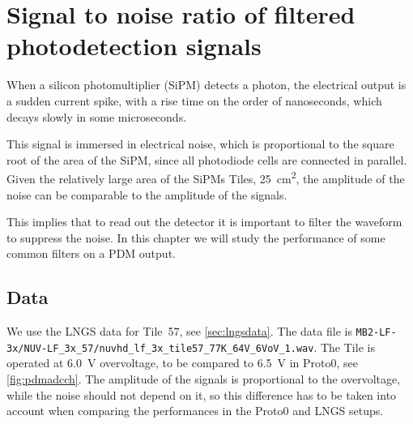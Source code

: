 \chapter{Signal to noise ratio of filtered photodetection signals}
\label{ch:snr}

When a silicon photomultiplier (SiPM) detects a photon, the electrical output
is a sudden current spike, with a rise time on the order of nanoseconds, which
decays slowly in some microseconds.

This signal is immersed in electrical noise, which is proportional to the
square root of the area of the SiPM, since all photodiode cells are connected
in parallel. Given the relatively large area of the SiPMs Tiles, \SI{25}{cm^2},
the amplitude of the noise can be comparable to the amplitude of the signals.

This implies that to read out the detector it is important to filter the
waveform to suppress the noise. In this chapter we will study the performance
of some common filters on a PDM output.

\section{Data}
\label{sec:snrdata}

\begin{figure}[p]
    
    
    
    
\end{figure}

\begin{figure}[p]
    


\end{figure}

We use the LNGS data for Tile~57, see \autoref{sec:lngsdata}. The data file is
\nolinkurl{MB2-LF-3x/NUV-LF_3x_57/nuvhd_lf_3x_tile57_77K_64V_6VoV_1.wav}. The
Tile is operated at \SI{6.0}{V} overvoltage, to be compared to \SI{6.5}{V} in
Proto0, see \autoref{fig:pdmadcch}. The amplitude of the signals is
proportional to the overvoltage, while the noise should not depend on it, so
this difference has to be taken into account when comparing the performances
in the Proto0 and LNGS setups.

